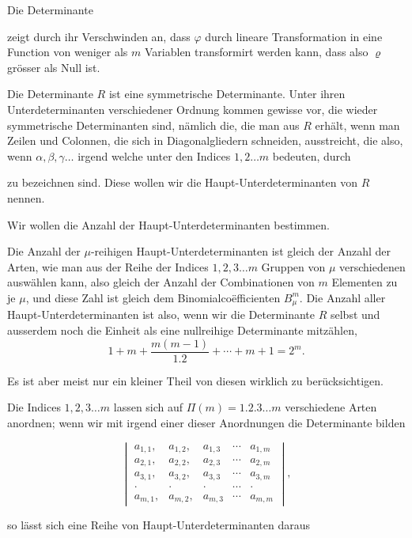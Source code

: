 
Die Determinante


zeigt durch ihr Verschwinden an, dass $\varphi$ durch lineare Transformation in eine Function von weniger als $m$ Variablen transformirt werden kann, dass also $\varrho$ grösser als Null ist.

Die Determinante $R$ ist eine symmetrische Determinante. Unter ihren Unterdeterminanten verschiedener Ordnung kommen gewisse vor, die wieder symmetrische Determinanten sind, nämlich die, die man aus $R$ erhält, wenn man Zeilen und Colonnen, die sich in Diagonalgliedern schneiden, ausstreicht, die also, wenn $\alpha, \beta, \gamma \ldots$ irgend welche unter den Indices $1, 2 \ldots m$ bedeuten, durch


zu bezeichnen sind. Diese wollen wir die Haupt-Unterdeterminanten von $R$ nennen.

Wir wollen die Anzahl der Haupt-Unterdeterminanten bestimmen.

Die Anzahl der $\mu$-reihigen Haupt-Unterdeterminanten ist gleich der Anzahl der Arten, wie man aus der Reihe der Indices $1, 2, 3 \ldots m$ Gruppen von $\mu$ verschiedenen auswählen kann, also gleich der Anzahl der Combinationen von $m$ Elementen zu je $\mu$, und diese Zahl ist gleich dem Binomialco\"efficienten $B_\mu^m$. Die Anzahl aller Haupt-Unterdeterminanten ist also, wenn wir die Determinante $R$ selbst und ausserdem noch die Einheit als eine nullreihige Determinante mitzählen,
\[
1 + m + \frac{m(m-1)}{1.2} + \cdots + m + 1 = 2^m.
\]

Es ist aber meist nur ein kleiner Theil von diesen wirklich zu berücksichtigen.

Die Indices $1, 2, 3 \ldots m$ lassen sich auf $\Pi(m) = 1.2.3 \ldots m$ verschiedene Arten anordnen; wenn wir mit irgend einer dieser Anordnungen die Determinante bilden

\[
\begin{vmatrix}
a_{1,1}, & a_{1,2}, & a_{1,3} & \cdots & a_{1,m} \\
a_{2,1}, & a_{2,2}, & a_{2,3} & \cdots & a_{2,m} \\
a_{3,1}, & a_{3,2}, & a_{3,3} & \cdots & a_{3,m} \\
\cdot & \cdot & \cdot & \cdots & \cdot \\
a_{m,1}, & a_{m,2}, & a_{m,3} & \cdots & a_{m,m}
\end{vmatrix},
\]

so lässt sich eine Reihe von Haupt-Unterdeterminanten daraus
